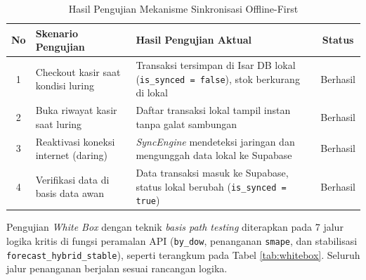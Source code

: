 \documentclass[10pt,a4paper]{article}
\begin{document}
\begin{table}[H]
  \centering
  \caption{Hasil Pengujian Mekanisme Sinkronisasi Offline-First}
  \label{tab:sinkronisasi}
  \fontsize{9pt}{11pt}\selectfont
  \begin{tabularx}{\textwidth}{clXc}
    \toprule
    \textbf{No} & \textbf{Skenario Pengujian} & \textbf{Hasil Pengujian Aktual} & \textbf{Status} \\
    \midrule
    1 & Checkout kasir saat kondisi luring & Transaksi tersimpan di Isar DB lokal (\texttt{is\_synced = false}), stok berkurang di lokal & Berhasil \\
    2 & Buka riwayat kasir saat luring & Daftar transaksi lokal tampil instan tanpa galat sambungan & Berhasil \\
    3 & Reaktivasi koneksi internet (daring) & \textit{SyncEngine} mendeteksi jaringan dan mengunggah data lokal ke Supabase & Berhasil \\
    4 & Verifikasi data di basis data awan & Data transaksi masuk ke Supabase, status lokal berubah (\texttt{is\_synced = true}) & Berhasil \\
    \bottomrule
  \end{tabularx}
\end{table}

Pengujian \textit{White Box} dengan teknik \textit{basis path testing} diterapkan pada 7 jalur logika kritis di fungsi peramalan API (\texttt{by\_dow}, penanganan \texttt{smape}, dan stabilisasi \texttt{forecast\_hybrid\_stable}), seperti terangkum pada Tabel \ref{tab:whitebox}. Seluruh jalur penanganan berjalan sesuai rancangan logika.
\end{document}
